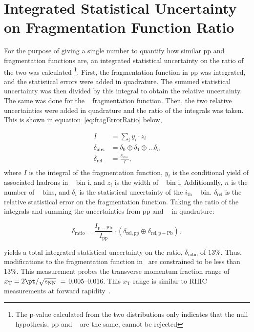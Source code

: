 
\section{Integrated Statistical Uncertainty on Fragmentation Function Ratio}
For the purpose of giving a single number to quantify how similar pp and \pPb~ fragmentation functions are, an integrated statistical uncertainty on the ratio of the two was calculated \footnote{The p-value calculated from the two distributions only indicates that the null hypothesis, pp and \pPb~ are the same, cannot be rejected}. First, the fragmentation function in pp was integrated, and the statistical errors were added in quadrature. The summed statistical uncertainty was then divided by this integral to obtain the relative uncertainty. The same was done for the \pPb~ fragmentation function. Then, the two relative uncertainties were added in quadrature and the ratio of the integrals was taken. This is shown in equation~\ref{eq:fragErrorRatio} below,

\begin{equation}\label{eq:fragErrorRatio}
  \begin{split}
    I &= \sum_i y_i\cdot z_i \\
    \delta_\mathrm{abs.} &= \delta_0 \oplus \delta_1 \oplus ...\delta_n\\
    \delta_\mathrm{rel} &= \frac{\delta_\mathrm{abs.}}{I},\\
  \end{split}
\end{equation}{}
where $I$ is the integral of the fragmentation function, $y_i$ is the conditional yield of associated hadrons in \zt~ bin i, and $z_i$ is the width of \zt~ bin i. Additionally, $n$ is the number of \zt~ bins, and $\delta_i$ is the statistical uncertainty of the $i_\mathrm{th}$ \zt~ bin. $\delta_\mathrm{rel}$ is the relative statistical error on the fragmentation function. Taking the ratio of the integrals and summing the uncertainties from pp and \pPb~ in quadrature:

\begin{equation}
  \delta_\mathrm{ratio} = \frac{I_\mathrm{p-Pb}}{I_\mathrm{pp}}\cdot (\delta_\mathrm{rel,pp} \oplus \delta_\mathrm{rel,p-Pb}),
\end{equation}

yields a total integrated statistical uncertainty on the ratio, $\delta_\mathrm{ratio}$ of 13\%. Thus, modifications to the fragmentation function in \pPb~are constrained to be less than 13\%. This measurement probes the transverse momentum fraction range of {$x_{\mathrm{T}} = 2\pt/\sqrt{s_{\mathrm{NN}}}\ = $ 0.005--0.016}. This $x_{\mathrm{T}}$ range is similar to RHIC measurements at forward rapidity~\cite{Adare:2011sc}.

